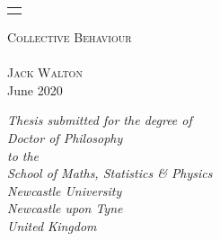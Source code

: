 \begin{titlepage}

  \begin{tabular}{c}
    \vspace{30mm}
  \end{tabular}

  \begin{center}
    \huge{\scshape Collective Behaviour}\\

    \vspace{2.5cm}
    \\

    \vspace{2.5cm}
    \Large{\scshape \hspace{2mm} Jack Walton}
    \vspace{0.5cm}\\
  	 \Large{June 2020}\\ 
    \vspace{2.5cm}

    \emph{\small
      Thesis submitted for the degree of\\
      \hspace{2mm}
      Doctor of Philosophy\\
      \vspace{0.2cm}
      to the\\
      \vspace{0.3cm}
      School of Maths, Statistics \& Physics\\
      Newcastle University\\
      Newcastle upon Tyne\\
      United Kingdom\\
    }        

  \end{center}

\end{titlepage}

\thispagestyle{empty}
\cleardoublepage
